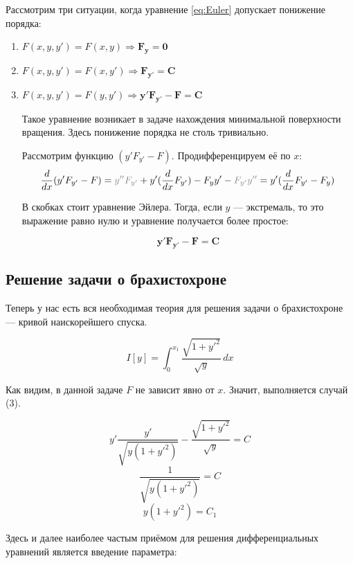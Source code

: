\documentclass[12pt]{article}
\begin{document}

			Рассмотрим три ситуации, когда уравнение \ref{eq:Euler} допускает понижение порядка:

			\begin{enumerate}
				\item $F(x,y,y') = F(x,y)  \Rightarrow \mathbf{F_y = 0}$
				\item $F(x,y,y') = F(x,y') \Rightarrow \mathbf{F_{y'} = C}$
				\item $F(x,y,y') = F(y,y') \Rightarrow \mathbf{y'F_{y'} - F = C}$

					Такое уравнение возникает в задаче нахождения минимальной поверхности вращения. Здесь
					понижение порядка не столь тривиально.

					Рассмотрим функцию $(y'F_{y'} - F)$. Продифференцируем её по $x$:
					$$\frac{d}{dx}(y'F_{y'} - F) =
			  			\off{y''F_{y'}} + y'(\frac{d}{dx}F_{y'}) - F_yy' - \off{F_{y'}y''} = 
			  			y'(\frac{d}{dx}F_{y'} - F_y)$$

					В скобках стоит уравнение Эйлера. Тогда, если $y$ --- экстремаль, то это выражение равно
					нулю и уравнение получается более простое:

					$$\mathbf{y'F_{y'} - F = C}$$
			\end{enumerate}

	\subsection{Решение задачи о брахистохроне}

		Теперь у нас есть вся необходимая теория для решения задачи о брахистохроне --- кривой наискорейшего
		спуска.

		$$I[y] = \int_0^{x_1} \frac{\sqrt{1+y'^2}}{\sqrt{y}} \,dx$$

		Как видим, в данной задаче $F$ не зависит явно от $x$. Значит, выполняется случай (3).

		$$y'\frac{y'}{\sqrt{y(1+y'^2)}} - \frac{\sqrt{1+y'^2}}{\sqrt{y}} = C$$
		$$\frac{1}{\sqrt{y(1+y'^2)}} = C$$
		$$y(1+y'^2) = C_1$$

		Здесь и далее наиболее частым приёмом для решения дифференциальных уравнений является введение параметра:
\end{document}
